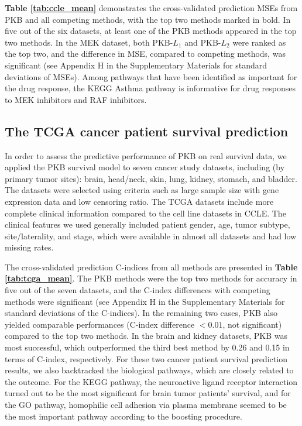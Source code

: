 \documentclass[a4paper,12pt]{article}
\begin{document}
\textbf{Table \ref{tab:ccle_mean}} demonstrates the cross-validated prediction MSEs from PKB and all competing methods, with the top two methods marked in bold. In five out of the six datasets, at least one of the PKB methods appeared in the top two methods. In the MEK dataset, both PKB-$L_1$ and PKB-$L_2$ were ranked as the top two, and the difference in MSE, compared to competing methods, was significant (see Appendix H in the Supplementary Materials for standard deviations of MSEs). Among pathways that have been identified as important for the drug response, the KEGG Asthma pathway is informative for drug responses to MEK inhibitors and RAF inhibitors.  


\subsection{The TCGA cancer patient survival prediction}

In order to assess the predictive performance of PKB on real survival data, we applied the PKB survival model to seven cancer study datasets, including (by primary tumor sites): brain, head/neck, skin, lung, kidney, stomach, and bladder. The datasets were selected using criteria such as large sample size with gene expression data and low censoring ratio. The TCGA datasets include more complete clinical information compared to the cell line datasets in CCLE. The clinical features we used generally included patient gender, age, tumor subtype, site/laterality, and stage, which were available in almost all datasets and had low missing rates. 

The cross-validated prediction C-indices from all methods are presented in \textbf{Table \ref{tab:tcga_mean}}. The PKB methods were the top two methods for accuracy in five out of the seven datasets, and the C-index differences with competing methods were significant (see Appendix H in the Supplementary Materials for standard deviations of the C-indices). In the remaining two cases, PKB also yielded comparable performances (C-index difference $< 0.01$, not significant) compared to the top two methods. In the brain and kidney datasets, PKB was most successful, which outperformed the third best method by 0.26 and 0.15 in terms of C-index, respectively. For these two cancer patient survival prediction results, we also backtracked the biological pathways, which are closely related to the outcome. For the KEGG pathway, the neuroactive ligand receptor interaction turned out to be the most significant for brain tumor patients' survival, and for the GO pathway, homophilic cell adhesion via plasma membrane seemed to be the most important pathway according to the boosting procedure. 
\end{document}
